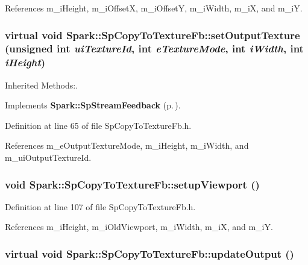 References m\_\-i\-Height, m\_\-i\-Offset\-X, m\_\-i\-Offset\-Y, m\_\-i\-Width, m\_\-i\-X, and m\_\-i\-Y.
\subsubsection{\setlength{\rightskip}{0pt plus 5cm}virtual void Spark::Sp\-Copy\-To\-Texture\-Fb::set\-Output\-Texture (unsigned int {\em ui\-Texture\-Id}, int {\em e\-Texture\-Mode}, int {\em i\-Width}, int {\em i\-Height})\hspace{0.3cm}{\tt  [inline, virtual]}}\label{classSpark_1_1SpCopyToTextureFb_a2}


Inherited Methods:. 



Implements {\bf Spark::Sp\-Stream\-Feedback} {\rm (p.\,\pageref{classSpark_1_1SpStreamFeedback_a0})}.

Definition at line 65 of file Sp\-Copy\-To\-Texture\-Fb.h.

References m\_\-e\-Output\-Texture\-Mode, m\_\-i\-Height, m\_\-i\-Width, and m\_\-ui\-Output\-Texture\-Id.
\subsubsection{\setlength{\rightskip}{0pt plus 5cm}void Spark::Sp\-Copy\-To\-Texture\-Fb::setup\-Viewport ()\hspace{0.3cm}{\tt  [inline]}}\label{classSpark_1_1SpCopyToTextureFb_a5}


Definition at line 107 of file Sp\-Copy\-To\-Texture\-Fb.h.

References m\_\-i\-Height, m\_\-i\-Old\-Viewport, m\_\-i\-Width, m\_\-i\-X, and m\_\-i\-Y.
\subsubsection{\setlength{\rightskip}{0pt plus 5cm}virtual void Spark::Sp\-Copy\-To\-Texture\-Fb::update\-Output ()\hspace{0.3cm}{\tt  [inline, virtual]}}\label{classSpark_1_1SpCopyToTextureFb_a3}




